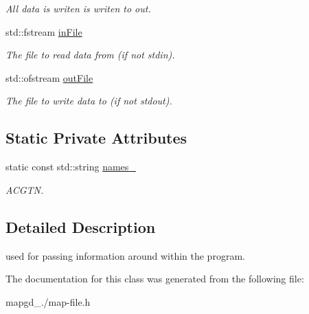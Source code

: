 \begin{DoxyCompactItemize}
\begin{DoxyCompactList}\small\item\em All data is writen is writen to out. \end{DoxyCompactList}\item 
\hypertarget{classmap__file_a65c33760be1a62037a1f39bcc4e1956d}{std\-::fstream \hyperlink{classmap__file_a65c33760be1a62037a1f39bcc4e1956d}{in\-File}}\label{classmap__file_a65c33760be1a62037a1f39bcc4e1956d}

\begin{DoxyCompactList}\small\item\em The file to read data from (if not stdin). \end{DoxyCompactList}\item 
\hypertarget{classmap__file_a87a4f5e42fd571b60d89de95a2bcf273}{std\-::ofstream \hyperlink{classmap__file_a87a4f5e42fd571b60d89de95a2bcf273}{out\-File}}\label{classmap__file_a87a4f5e42fd571b60d89de95a2bcf273}

\begin{DoxyCompactList}\small\item\em The file to write data to (if not stdout). \end{DoxyCompactList}\end{DoxyCompactItemize}
\subsection*{Static Private Attributes}
\begin{DoxyCompactItemize}
\item 
\hypertarget{classmap__file_a1b7a0c4fc816b239681e7d99b435e8e8}{static const std\-::string \hyperlink{classmap__file_a1b7a0c4fc816b239681e7d99b435e8e8}{names\-\_\-}}\label{classmap__file_a1b7a0c4fc816b239681e7d99b435e8e8}

\begin{DoxyCompactList}\small\item\em A\-C\-G\-T\-N. \end{DoxyCompactList}\end{DoxyCompactItemize}


\subsection{Detailed Description}
used for passing information around within the program. 

The documentation for this class was generated from the following file\-:\begin{DoxyCompactItemize}
\item 
mapgd\-\_./map-\/file.\-h\end{DoxyCompactItemize}
